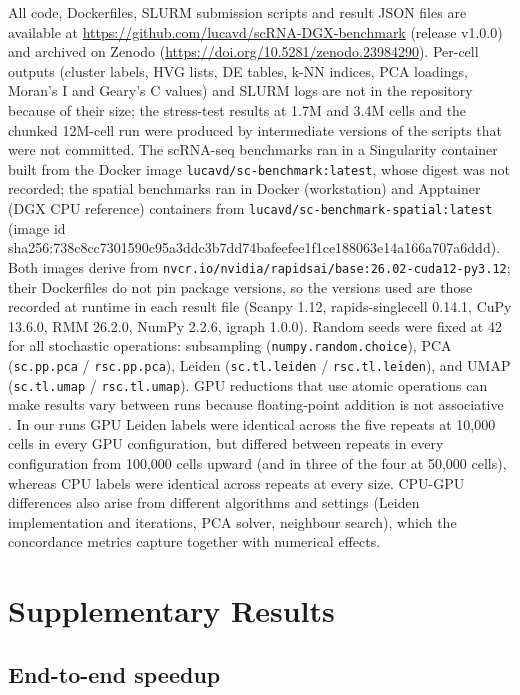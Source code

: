 \documentclass[runningheads]{llncs}
\begin{document}
All code, Dockerfiles, SLURM submission scripts and result JSON files are available at \url{https://github.com/lucavd/scRNA-DGX-benchmark} (release v1.0.0) and archived on Zenodo (\url{https://doi.org/10.5281/zenodo.23984290}). Per-cell outputs (cluster labels, HVG lists, DE tables, k-NN indices, PCA loadings, Moran's I and Geary's C values) and SLURM logs are not in the repository because of their size; the stress-test results at 1.7M and 3.4M cells and the chunked 12M-cell run were produced by intermediate versions of the scripts that were not committed.
The scRNA-seq benchmarks ran in a Singularity container built from the Docker image \nolinkurl{lucavd/sc-benchmark:latest}, whose digest was not recorded; the spatial benchmarks ran in Docker (workstation) and Apptainer (DGX CPU reference) containers from \nolinkurl{lucavd/sc-benchmark-spatial:latest} (image id sha256:738c8cc7301590c9\allowbreak{}5a3ddc3b7dd74baf\allowbreak{}eefee1f1ce188063\allowbreak{}e14a166a707a6ddd). Both images derive from \nolinkurl{nvcr.io/nvidia/rapidsai/base:26.02-cuda12-py3.12}; their Dockerfiles do not pin package versions, so the versions used are those recorded at runtime in each result file (Scanpy 1.12, rapids-singlecell 0.14.1, CuPy 13.6.0, RMM 26.2.0, NumPy 2.2.6, igraph 1.0.0).
Random seeds were fixed at 42 for all stochastic operations: subsampling (\texttt{numpy.random.choice}), PCA (\texttt{sc.pp.pca} / \texttt{rsc.pp.pca}), Leiden (\texttt{sc.tl.leiden} / \texttt{rsc.tl.leiden}), and UMAP (\texttt{sc.tl.umap} / \texttt{rsc.tl.umap}).
GPU reductions that use atomic operations can make results vary between runs because floating-point addition is not associative \cite{Collange2015,Shanmugavelu2024}. In our runs GPU Leiden labels were identical across the five repeats at 10,000 cells in every GPU configuration, but differed between repeats in every configuration from 100,000 cells upward (and in three of the four at 50,000 cells), whereas CPU labels were identical across repeats at every size. CPU-GPU differences also arise from different algorithms and settings (Leiden implementation and iterations, PCA solver, neighbour search), which the concordance metrics capture together with numerical effects.

\hypertarget{supplementary-results}{%
\section{Supplementary Results}\label{supplementary-results}}

\hypertarget{end-to-end-speedup}{%
\subsection{End-to-end speedup}\label{end-to-end-speedup}}
\end{document}
